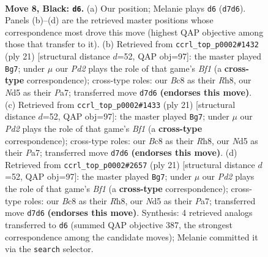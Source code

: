 \documentclass[11pt]{article}
\begin{document}
\begin{figure}[p]\centering
\begin{subfigure}{0.46\textwidth}\centering
\resizebox{\linewidth}{!}{%
\newchessgame
\chessboard[
  setfen={r1b1kb1r/p1ppqppp/2p5/3nP3/8/5P2/PPP1Q1PP/RNB1KB1R b KQkq - 0 8},
  showmover=false,
  pgfstyle=straightmove, color=movearrow, markmove={d7-d6}
]}
\caption{}
\end{subfigure}\hfill
\begin{subfigure}{0.46\textwidth}\centering
\resizebox{\linewidth}{!}{%
\newchessgame
\chessboard[
  setfen={r3kb1r/p1ppqp1p/b1p3p1/4P3/1nP5/1P6/PB2QPPP/RN2KB1R b KQkq - 3 11},
  showmover=false,
  pgfstyle=straightmove, color=movearrow, markmove={f8-g7}
]}
\caption{}
\end{subfigure}
\\[4pt]
\begin{subfigure}{0.46\textwidth}\centering
\resizebox{\linewidth}{!}{%
\newchessgame
\chessboard[
  setfen={r3kb1r/p1ppqp1p/b1p3p1/4P3/1nP5/1P6/PB2QPPP/RN2KB1R b KQkq - 3 11},
  showmover=false,
  pgfstyle=straightmove, color=movearrow, markmove={f8-g7}
]}
\caption{}
\end{subfigure}\hfill
\begin{subfigure}{0.46\textwidth}\centering
\resizebox{\linewidth}{!}{%
\newchessgame
\chessboard[
  setfen={r3kb1r/p1ppqp1p/b1p3p1/4P3/1nP5/1P6/PB2QPPP/RN2KB1R b KQkq - 3 11},
  showmover=false,
  pgfstyle=straightmove, color=movearrow, markmove={f8-g7}
]}
\caption{}
\end{subfigure}
\caption{\textbf{Move 8, Black: \texttt{d6}.} (a) Our position; Melanie plays \texttt{d6} (\texttt{d7d6}). Panels (b)--(d) are the retrieved master positions whose correspondence most drove this move (highest QAP objective among those that transfer to it). (b) Retrieved from \texttt{ccrl\_top\_p0002\#1432} (ply 21) [structural distance $d$=52, QAP obj=97]: the master played \texttt{Bg7}; under $\mu$ our \emph{Pd2} plays the role of that game's \emph{Bf1} (a \textbf{cross-type} correspondence); cross-type roles: our \emph{B}c8 as their \emph{R}h8, our \emph{N}d5 as their \emph{P}a7; transferred move \texttt{d7d6} \textbf{(endorses this move)}. (c) Retrieved from \texttt{ccrl\_top\_p0002\#1433} (ply 21) [structural distance $d$=52, QAP obj=97]: the master played \texttt{Bg7}; under $\mu$ our \emph{Pd2} plays the role of that game's \emph{Bf1} (a \textbf{cross-type} correspondence); cross-type roles: our \emph{B}c8 as their \emph{R}h8, our \emph{N}d5 as their \emph{P}a7; transferred move \texttt{d7d6} \textbf{(endorses this move)}. (d) Retrieved from \texttt{ccrl\_top\_p0002\#2657} (ply 21) [structural distance $d$=52, QAP obj=97]: the master played \texttt{Bg7}; under $\mu$ our \emph{Pd2} plays the role of that game's \emph{Bf1} (a \textbf{cross-type} correspondence); cross-type roles: our \emph{B}c8 as their \emph{R}h8, our \emph{N}d5 as their \emph{P}a7; transferred move \texttt{d7d6} \textbf{(endorses this move)}. Synthesis: 4 retrieved analogs transferred to \texttt{d6} (summed QAP objective 387, the strongest correspondence among the candidate moves); Melanie committed it via the \texttt{search} selector.}
\label{fig:thought-m15}
\end{figure}
\end{document}
